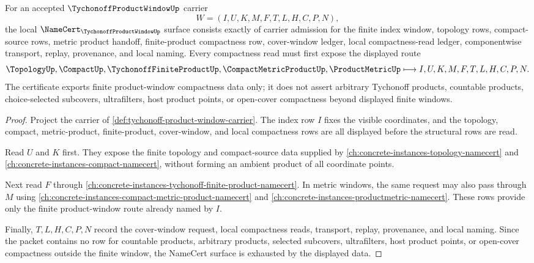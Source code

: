 \begin{theorem}
\label{thm:tychonoff-product-window-namecert-obligations}
For an accepted $\TychonoffProductWindowUp$ carrier
$$
W=(I,U,K,M,F,T,L,H,C,P,N),
$$
the local $\NameCert_{\TychonoffProductWindowUp}$ surface consists exactly of carrier admission for the finite index window, topology rows, compact-source rows, metric product handoff, finite-product compactness row, cover-window ledger, local compactness-read ledger, componentwise transport, replay, provenance, and local naming. Every compactness read must first expose the displayed route
$$
\TopologyUp,\CompactUp,\TychonoffFiniteProductUp,\CompactMetricProductUp,\ProductMetricUp
\longmapsto
I,U,K,M,F,T,L,H,C,P,N .
$$
The certificate exports finite product-window compactness data only; it does not assert arbitrary Tychonoff products, countable products, choice-selected subcovers, ultrafilters, host product points, or open-cover compactness beyond displayed finite windows.
\end{theorem}
\begin{proof}
Project the carrier of \autoref{def:tychonoff-product-window-carrier}. The index row $I$ fixes the visible coordinates, and the topology, compact, metric-product, finite-product, cover-window, and local compactness rows are all displayed before the structural rows are read.

Read $U$ and $K$ first. They expose the finite topology and compact-source data supplied by \autoref{ch:concrete-instances-topology-namecert} and \autoref{ch:concrete-instances-compact-namecert}, without forming an ambient product of all coordinate points.

Next read $F$ through \autoref{ch:concrete-instances-tychonoff-finite-product-namecert}. In metric windows, the same request may also pass through $M$ using \autoref{ch:concrete-instances-compact-metric-product-namecert} and \autoref{ch:concrete-instances-productmetric-namecert}. These rows provide only the finite product-window route already named by $I$.

Finally, $T,L,H,C,P,N$ record the cover-window request, local compactness reads, transport, replay, provenance, and local naming. Since the packet contains no row for countable products, arbitrary products, selected subcovers, ultrafilters, host product points, or open-cover compactness outside the finite window, the NameCert surface is exhausted by the displayed data.
\end{proof}

